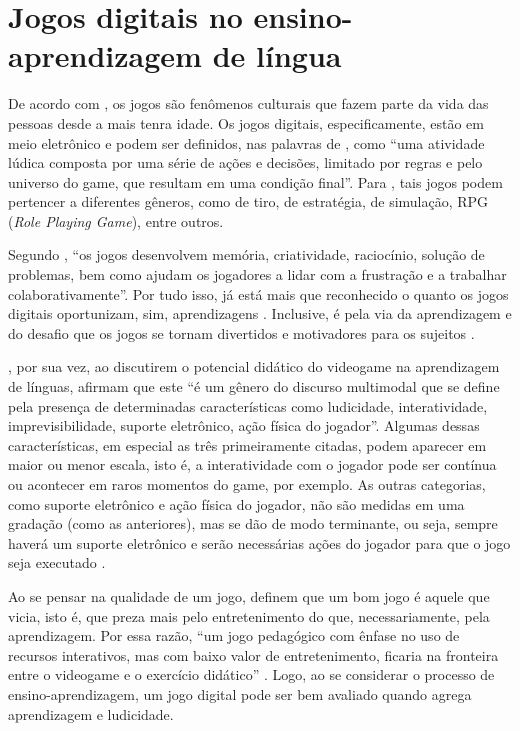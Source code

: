 \documentclass{textolivre}
\begin{document}
\section{Jogos digitais no ensino-aprendizagem de língua}\label{sec-2}
De acordo com \textcite{gee2004}, os jogos são fenômenos culturais que fazem parte da vida das pessoas desde a mais tenra idade. Os jogos digitais, especificamente, estão em meio eletrônico e podem ser definidos, nas palavras de \textcite[p. 7]{schuytema2016}, como “uma atividade lúdica composta por uma série de ações e decisões, limitado por regras e pelo universo do game, que resultam em uma condição final”. Para \textcite{gee2004}, tais jogos podem pertencer a diferentes gêneros, como de tiro, de estratégia, de simulação, RPG (\emph{Role Playing Game}), entre outros.

Segundo \textcite[p. 13]{coscarelli2016}, “os jogos desenvolvem memória, criatividade, raciocínio, solução de problemas, bem como ajudam os jogadores a lidar com a frustração e a trabalhar colaborativamente”. Por tudo isso, já está mais que reconhecido o quanto os jogos digitais oportunizam, sim, aprendizagens \cite{gee2004, jones2004, ribeiro2016}. Inclusive, é pela via da aprendizagem e do desafio que os jogos se tornam divertidos e motivadores para os sujeitos \cite{gee2009}.

\textcite[p. 218]{leffa2012}, por sua vez, ao discutirem o potencial didático do videogame na aprendizagem de línguas, afirmam que este “é um gênero do discurso multimodal que se define pela presença de determinadas características como ludicidade, interatividade, imprevisibilidade, suporte eletrônico, ação física do jogador”. Algumas dessas características, em especial as três primeiramente citadas, podem aparecer em maior ou menor escala, isto é, a interatividade com o jogador pode ser contínua ou acontecer em raros momentos do game, por exemplo. As outras categorias, como suporte eletrônico e ação física do jogador, não são medidas em uma gradação (como as anteriores), mas se dão de modo terminante, ou seja, sempre haverá um suporte eletrônico e serão necessárias ações do jogador para que o jogo seja executado \cite{leffa2012}.

Ao se pensar na qualidade de um jogo, \textcite{leffa2012} definem que um bom jogo é aquele que vicia, isto é, que preza mais pelo entretenimento do que, necessariamente, pela aprendizagem. Por essa razão, “um jogo pedagógico com ênfase no uso de recursos interativos, mas com baixo valor de entretenimento, ficaria na fronteira entre o videogame e o exercício didático” \cite[p. 219]{leffa2012}. Logo, ao se considerar o processo de ensino-aprendizagem, um jogo digital pode ser bem avaliado quando agrega aprendizagem e ludicidade.
\end{document}

